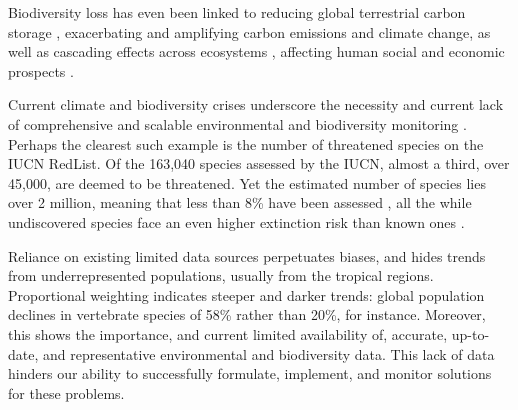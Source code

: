 Biodiversity loss has even been linked to reducing global terrestrial carbon storage \cite{Weiskopf2024}, exacerbating and amplifying carbon emissions and climate change, as well as cascading effects across ecosystems \cite{Rosenberg2019, Ceballos2015}, affecting human social and economic prospects \cite{Frank2024, Portner2023}.
 
Current climate and biodiversity crises \cite{Pereira2024, Weiskopf2024, Pimm2014, Portner2023} underscore the necessity and current lack of comprehensive and scalable environmental and biodiversity monitoring \cite{Gonzalez2023a, McRae2017, Gonzalez2016, Mora2011}. 
Perhaps the clearest such example is the number of threatened species on the IUCN RedList. Of the 163,040 species assessed by the IUCN, almost a third, over 45,000, are deemed to be threatened. Yet the estimated number of species lies over 2 million, meaning that less than 8\% have been assessed \cite{IUCN2024}, all the while undiscovered species face an even higher extinction risk than known ones \cite{Liu2022a}.

Reliance on existing limited data sources perpetuates biases, and hides trends from underrepresented populations, usually from the tropical regions. Proportional weighting indicates steeper and darker trends: global population declines in vertebrate species of 58\% rather than 20\%, for instance\cite{McRae2017}. Moreover, this shows the importance, and current limited availability of, accurate, up-to-date, and representative environmental and biodiversity data. This lack of data hinders our ability to successfully formulate, implement, and monitor solutions for these problems. 





